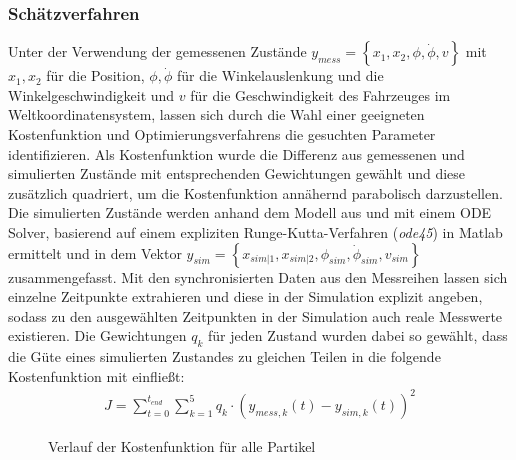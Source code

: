 \subsubsection{Schätzverfahren}
Unter der Verwendung der gemessenen Zustände $y_{mess} = \left \{x_1, x_2, \phi, \dot{\phi}, v  \right \}$ mit $x_1, x_2$ für die Position, $\phi, \dot{\phi}$ für die Winkelauslenkung und die Winkelgeschwindigkeit und $v$ für die Geschwindigkeit des Fahrzeuges im Weltkoordinatensystem, lassen sich durch die Wahl einer geeigneten Kostenfunktion und Optimierungsverfahrens die gesuchten Parameter identifizieren. Als Kostenfunktion wurde die Differenz aus gemessenen und simulierten Zustände mit entsprechenden Gewichtungen gewählt und diese zusätzlich quadriert, um die Kostenfunktion annähernd parabolisch darzustellen. Die simulierten Zustände werden anhand dem Modell aus \cite{VikAnd} und mit einem ODE Solver, basierend auf einem expliziten Runge-Kutta-Verfahren (\textit{ode45}) in Matlab ermittelt und in dem Vektor $y_{sim} = \left \{x_{sim|1}, x_{sim|2}, \phi_{sim}, \dot{\phi}_{sim}, v_{sim}  \right \}$ zusammengefasst. Mit den synchronisierten Daten aus den Messreihen lassen sich einzelne Zeitpunkte extrahieren und diese in der Simulation explizit angeben, sodass zu den ausgewählten Zeitpunkten in der Simulation auch reale Messwerte existieren. Die Gewichtungen $q_k$ für jeden Zustand wurden dabei so gewählt, dass die Güte eines simulierten Zustandes zu gleichen Teilen in die folgende Kostenfunktion mit einfließt:
\begin{align*}
J = \sum_{t=0}^{t_{end}}\sum_{k = 1}^{5} q_k\cdot  \left (y_{mess, k}\left ( t \right ) - y_{sim, k}\left ( t \right )  \right )^2
\end{align*}
\begin{figure} 
 \GenerationLokal
\centering
{}
\caption{Verlauf der Kostenfunktion für alle Partikel}
\label{pict:PSOallePart}
\end{figure}
